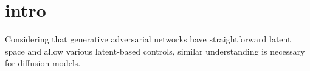 \section{intro}
Considering that generative adversarial networks have straightforward latent space and allow various latent-based controls, similar understanding is necessary for diffusion models.






